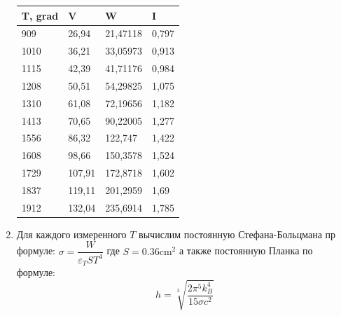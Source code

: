 \documentclass[a4paper,12pt]{article}
\theoremstyle{plain} %
\theoremstyle{definition} %
\theoremstyle{remark} %
\begin{document}
\begin{enumerate}
\begin{table}[]
\begin{tabular}{|l|l|l|l|}
\hline
\rowcolor[HTML]{FFCC67} 
{\color[HTML]{000000} T, grad} & {\color[HTML]{000000} V} & {\color[HTML]{000000} W} & I     \\ \hline
909                            & 26,94                    & 21,47118                 & 0,797 \\ \hline
1010                           & 36,21                    & 33,05973                 & 0,913 \\ \hline
1115                           & 42,39                    & 41,71176                 & 0,984 \\ \hline
1208                           & 50,51                    & 54,29825                 & 1,075 \\ \hline
1310                           & 61,08                    & 72,19656                 & 1,182 \\ \hline
1413                           & 70,65                    & 90,22005                 & 1,277 \\ \hline
1556                           & 86,32                    & 122,747                  & 1,422 \\ \hline
1608                           & 98,66                    & 150,3578                 & 1,524 \\ \hline
1729                           & 107,91                   & 172,8718                 & 1,602 \\ \hline
1837                           & 119,11                   & 201,2959                 & 1,69  \\ \hline
1912                           & 132,04                   & 235,6914                 & 1,785 \\ \hline
\end{tabular}
\end{table}

\item Для каждого измеренного $T$ вычислим постоянную Стефана-Больцмана пр формуле: 
$\sigma = \dfrac{W}{\varepsilon_T S T^4}$ где $S = 0.36 \text{cm}^2$ а также постоянную Планка по формуле: 
\[ h = \sqrt[3]{\dfrac{2 \pi^5 k_B^4}{15 \sigma c^2}} \]

\end{enumerate}
\end{document}
